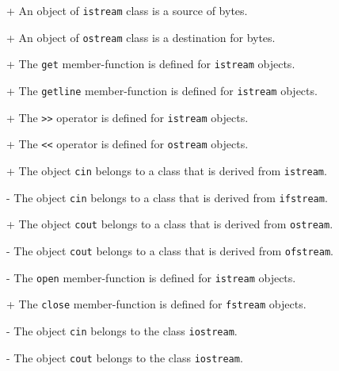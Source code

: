 + An object of \verb|istream| class is a source of bytes.

+ An object of \verb|ostream| class is a destination for bytes.

+ The \verb|get| member-function is defined for \verb|istream| objects.

+ The \verb|getline| member-function is defined for \verb|istream| objects.

+ The \verb|>>| operator is defined for \verb|istream| objects.

+ The \verb|<<| operator is defined for \verb|ostream| objects.

+ The object \verb|cin| belongs to a class that is derived from \verb|istream|.

- The object \verb|cin| belongs to a class that is derived from \verb|ifstream|.

+ The object \verb|cout| belongs to a class that is derived from \verb|ostream|.

- The object \verb|cout| belongs to a class that is derived from \verb|ofstream|.

- The \verb|open| member-function is defined for \verb|istream| objects.

+ The \verb|close| member-function is defined for \verb|fstream| objects.

- The object \verb|cin| belongs to the class \verb|iostream|.

- The object \verb|cout| belongs to the class \verb|iostream|.